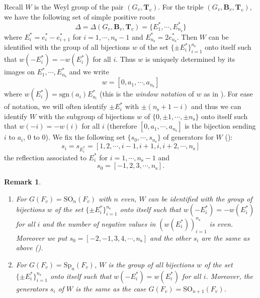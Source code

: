 \documentclass[12pt,oneside,reqno]{amsart}
\theoremstyle{plain}
\newtheorem{remark}[theorem]{Remark}
\begin{document}
	
	
	
	
	
	Recall
	$W$
	is the Weyl group of the pair
	$( G_v,\mathbf{T}_v)$.
	For the triple
	$( G_v,\mathbf{B}_v,\mathbf{T}_v)$,
	we have the following set of simple positive roots
	\[
	\Delta=
	\Delta( G_v,\mathbf{B}_v,\mathbf{T}_v)
	=
	\{
	E^\ast_1,\cdots,E^\ast_{n_\mathrm{s}}
	\}
	\]
	where
	$E^\ast_i=e^\ast_i-e^\ast_{i+1}$
	for $i=1,\cdots,n_\mathrm{s}-1$
	and
	$E^\ast_{n_\mathrm{s}}=2e^\ast_{n_\mathrm{s}}$.
	Then
	$W$ can be identified with the group of all
	bijections $w$ of
	the set
	$\{\pm E_i^\ast\}_{i=1}^{n_\mathrm{s}}$
	onto itself
	such that
	$w(-E^\ast_i)=-w(E^\ast_i)$
	for all $i$.
	Thus $w$ is uniquely determined by
	its images on
	$E^\ast_1,\cdots,E^\ast_{n_\mathrm{s}}$
	and we write
	\[
	w=[0,a_1,\cdots,a_{n_\mathrm{s}}]
	\]
	where
	$w(E^\ast_i)=\mathrm{sgn}(a_i)E^\ast_{a_i}$
	(this is the \emph{window notation} of $w$ as in
	\cite[p.245]{BjonerBrenti2005}).
	For ease of notation,
	we will often identify
	$\pm E^\ast_i$
	with $\pm (n_\mathrm{s}+1-i)$
	and thus we can identify
	$W$ with the subgroup of
	bijections $w$ of
	$\{0,\pm1,\cdots,\pm n_\mathrm{s}\}$
	onto itself
	such that
	$w(-i)=-w(i)$
	for all $i$
	(therefore
	$[0,a_1,\cdots,a_{n_\mathrm{s}}]$
	is the bijection sending $i$ to $a_i$, $0$ to $0$).
	We fix the following set $\{s_0,\cdots,s_{n_\mathrm{s}}\}$ of generators for $W$ (\cite[p.246]{BjonerBrenti2005}):
	\[
	s_i=s_{E^\ast_i}=[1,2,\cdots,i-1,i+1,i,i+2,\cdots,n_\mathrm{s}]
	\]
	the reflection associated to $E^\ast_i$
	for $i=1,\cdots,n_\mathrm{s}-1$
	and
	\[
	s_0=[-1,2,3,\cdots,n_\mathrm{s}].
	\]
	\begin{remark}\rm
		\begin{enumerate}
			\item 
			For $G(F_v)=\mathrm{SO}_n(F_v)$ with $n$ even,
			$W$ can be identified with the group of bijections $w$ of
			the set
			$\{\pm E_i^\ast\}_{i=1}^{n_{\mathrm{s}}}$
			onto itself such that
			$w(-E_i^\ast)=-w(E_i^\ast)$
			for all $i$
			and the number of negative values in
			$(w(E_i^\ast))_{i=1}^{n_{\mathrm{s}}}$
			is \emph{even}.
			Moreover we put
			$s_0=[-2,-1,3,4,\cdots,n_{\mathrm{s}}]$ and the other $s_i$ are the same as above (\cite[p.253]{BjonerBrenti2005}).
			
			
			
			\item 
			For $G(F_v)=\mathrm{Sp}_n(F_v)$, $W$ is the group of all bijections $w$ of the set $\{\pm E_i^\ast\}_{i=1}^{n_\mathrm{s}}$ onto itself such that $w(-E_i^\ast)=w(E_i^\ast)$ for all $i$. Moreover, the generators $s_i$ of $W$ is the same as the case $G(F_v)=\mathrm{SO}_{n+1}(F_v)$.
		\end{enumerate}
		
	\end{remark}
\end{document}
